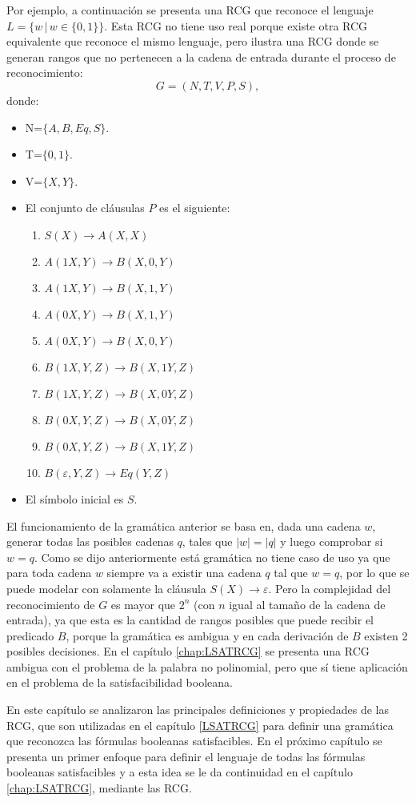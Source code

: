Por ejemplo, a continuación se presenta una RCG que reconoce el lenguaje $L=\{w\,|\,w\in\{0,1\}\}$. Esta RCG no tiene uso real porque existe otra RCG equivalente que reconoce el
mismo lenguaje, pero ilustra una RCG donde se generan rangos que no pertenecen a la cadena de entrada durante el proceso
de reconocimiento:
\[
    G = (N, T, V, P, S),
\]
donde:

\begin{itemize}
    \item  N=$\{A,B,Eq,S\}$.
    \item T=$\{0,1\}$.
    \item V=$\{X,Y\}$.
    \item El conjunto de cláusulas $P$ es el siguiente:
          \begin{enumerate}
              \item $S(X)\to A(X,X)$
              \item $A(1X,Y)\to B(X,0,Y)$
              \item $A(1X,Y)\to B(X,1,Y)$
              \item $A(0X,Y)\to B(X,1,Y)$
              \item $A(0X,Y)\to B(X,0,Y)$
              \item $B(1X,Y,Z)\to B(X,1Y,Z)$
              \item $B(1X,Y,Z)\to B(X,0Y,Z)$
              \item $B(0X,Y,Z)\to B(X,0Y,Z)$
              \item $B(0X,Y,Z)\to B(X,1Y,Z)$
              \item $B(\varepsilon,Y,Z)\to Eq(Y,Z)$
          \end{enumerate}

    \item El símbolo inicial es $S$.
\end{itemize}

El funcionamiento de la gramática anterior se basa en, dada una cadena $w$, generar todas las posibles
cadenas $q$, tales que $|w|=|q|$ y luego comprobar si $w = q$. Como se dijo anteriormente está gramática
no tiene caso de uso ya que para toda cadena $w$ siempre va a existir una cadena $q$ tal que $w=q$,
por lo que se puede modelar con solamente la cláusula $S(X)\to \varepsilon$. Pero la complejidad del
reconocimiento de $G$ es mayor que $2^n$ (con $n$ igual al tamaño de la cadena de entrada), ya que esta
es la cantidad de rangos posibles que puede recibir el predicado $B$, porque la gramática es ambigua
y en cada derivación de $B$ existen 2 posibles decisiones. En el capítulo \ref{chap:LSATRCG} se presenta una
RCG ambigua con el problema de la palabra no polinomial, pero que sí tiene aplicación en el problema de la
satisfacibilidad booleana.

En este capítulo se analizaron las principales definiciones y propiedades de las RCG, que son utilizadas
en el capítulo \ref{LSATRCG} para definir una gramática que reconozca las fórmulas booleanas satisfacibles.
En el próximo capítulo se presenta un primer enfoque para definir el lenguaje de todas las fórmulas booleanas
satisfacibles y a esta idea se le da continuidad en el capítulo \ref{chap:LSATRCG}, mediante las RCG.
